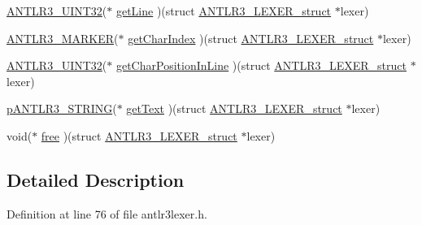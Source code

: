 \begin{DoxyCompactItemize}
\item 
\hyperlink{antlr3defs_8h_ac41f744abd0fd25144b9eb9d11b1dfd1}{A\-N\-T\-L\-R3\-\_\-\-U\-I\-N\-T32}($\ast$ \hyperlink{struct_a_n_t_l_r3___l_e_x_e_r__struct_a151c4767a28ceccf7fb5bd81e30eaeec}{get\-Line} )(struct \hyperlink{struct_a_n_t_l_r3___l_e_x_e_r__struct}{A\-N\-T\-L\-R3\-\_\-\-L\-E\-X\-E\-R\-\_\-struct} $\ast$lexer)
\item 
\hyperlink{antlr3defs_8h_a0361e6bf442e07afe923e4d05e9ebc4f}{A\-N\-T\-L\-R3\-\_\-\-M\-A\-R\-K\-E\-R}($\ast$ \hyperlink{struct_a_n_t_l_r3___l_e_x_e_r__struct_a3c09f36c7367d7755563155adcabdcc1}{get\-Char\-Index} )(struct \hyperlink{struct_a_n_t_l_r3___l_e_x_e_r__struct}{A\-N\-T\-L\-R3\-\_\-\-L\-E\-X\-E\-R\-\_\-struct} $\ast$lexer)
\item 
\hyperlink{antlr3defs_8h_ac41f744abd0fd25144b9eb9d11b1dfd1}{A\-N\-T\-L\-R3\-\_\-\-U\-I\-N\-T32}($\ast$ \hyperlink{struct_a_n_t_l_r3___l_e_x_e_r__struct_a2b5e18cf9d9b55bfcc02d345c5e8f848}{get\-Char\-Position\-In\-Line} )(struct \hyperlink{struct_a_n_t_l_r3___l_e_x_e_r__struct}{A\-N\-T\-L\-R3\-\_\-\-L\-E\-X\-E\-R\-\_\-struct} $\ast$lexer)
\item 
\hyperlink{antlr3interfaces_8h_a36bbe7362079348864db4b4dbdcce56b}{p\-A\-N\-T\-L\-R3\-\_\-\-S\-T\-R\-I\-N\-G}($\ast$ \hyperlink{struct_a_n_t_l_r3___l_e_x_e_r__struct_aa916fc721b7c14ee4bb57b1c7fb88e60}{get\-Text} )(struct \hyperlink{struct_a_n_t_l_r3___l_e_x_e_r__struct}{A\-N\-T\-L\-R3\-\_\-\-L\-E\-X\-E\-R\-\_\-struct} $\ast$lexer)
\item 
void($\ast$ \hyperlink{struct_a_n_t_l_r3___l_e_x_e_r__struct_a793226480ca08fbcac7b61578fb2430c}{free} )(struct \hyperlink{struct_a_n_t_l_r3___l_e_x_e_r__struct}{A\-N\-T\-L\-R3\-\_\-\-L\-E\-X\-E\-R\-\_\-struct} $\ast$lexer)
\end{DoxyCompactItemize}


\subsection{Detailed Description}


Definition at line 76 of file antlr3lexer.\-h.



